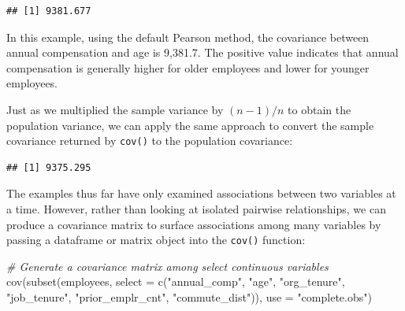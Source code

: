 \documentclass[
]{book}
\newenvironment{Shaded}{\begin{snugshade}}{\end{snugshade}}
\newcommand{\AttributeTok}[1]{\textcolor[rgb]{0.77,0.63,0.00}{#1}}
\newcommand{\CommentTok}[1]{\textcolor[rgb]{0.56,0.35,0.01}{\textit{#1}}}
\newcommand{\DecValTok}[1]{\textcolor[rgb]{0.00,0.00,0.81}{#1}}
\newcommand{\FunctionTok}[1]{\textcolor[rgb]{0.00,0.00,0.00}{#1}}
\newcommand{\NormalTok}[1]{#1}
\newcommand{\SpecialCharTok}[1]{\textcolor[rgb]{0.00,0.00,0.00}{#1}}
\newcommand{\StringTok}[1]{\textcolor[rgb]{0.31,0.60,0.02}{#1}}
\begin{document}
\begin{Shaded}
\end{Shaded}

\begin{verbatim}
## [1] 9381.677
\end{verbatim}

In this example, using the default Pearson method, the covariance between annual compensation and age is 9,381.7. The positive value indicates that annual compensation is generally higher for older employees and lower for younger employees.

Just as we multiplied the sample variance by \((n - 1) / n\) to obtain the population variance, we can apply the same approach to convert the sample covariance returned by \texttt{cov()} to the population covariance:

\begin{Shaded}
\end{Shaded}

\begin{verbatim}
## [1] 9375.295
\end{verbatim}

The examples thus far have only examined associations between two variables at a time. However, rather than looking at isolated pairwise relationships, we can produce a covariance matrix to surface associations among many variables by passing a dataframe or matrix object into the \texttt{cov()} function:

\begin{Shaded}
\begin{Highlighting}[]
\CommentTok{\# Generate a covariance matrix among select continuous variables}
\FunctionTok{cov}\NormalTok{(}\FunctionTok{subset}\NormalTok{(employees, }\AttributeTok{select =} \FunctionTok{c}\NormalTok{(}\StringTok{"annual\_comp"}\NormalTok{, }\StringTok{"age"}\NormalTok{, }\StringTok{"org\_tenure"}\NormalTok{, }\StringTok{"job\_tenure"}\NormalTok{, }\StringTok{"prior\_emplr\_cnt"}\NormalTok{, }\StringTok{"commute\_dist"}\NormalTok{)), }\AttributeTok{use =} \StringTok{"complete.obs"}\NormalTok{)}
\end{Highlighting}
\end{Shaded}
\end{document}
